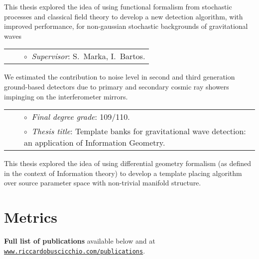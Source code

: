 This thesis explored the idea of using functional formalism from stochastic processes and classical field theory to develop a new detection algorithm, with improved performance, for non-gaussian stochastic backgrounds of gravitational waves

\vspace{0.2cm}
\vspace{-0.1cm}
\begin{tabular}{rcl}
&\hspace{0.4cm} &$\circ\;\;${\textit{Supervisor}}: S.~Marka, I.~Bartos.
\end{tabular}
\vspace{0.2cm}

We estimated the contribution to noise level in second and third generation ground-based detectors due to primary and secondary cosmic ray showers impinging on the interferometer mirrors.

\vspace{0.2cm}
\vspace{-0.1cm}
\begin{tabular}{rcl}
&\hspace{0.4cm} &$\circ\;\;${\textit{Final degree grade}}: 109/110.\\
&\hspace{0.4cm} &$\circ\;\;${\textit{Thesis title}}: Template banks for gravitational wave detection: an application of Information Geometry.
\end{tabular}
\vspace{0.2cm}


This thesis explored the idea of using differential geometry formalism (as defined in the context of Information theory) to develop a template placing algorithm over source parameter space with non-trivial manifold structure.

\section{Metrics}



\textbf{Full list of publications} available 
below and
at \href{http://www.riccardobuscicchio.com/publications}{\texttt{www.riccardobuscicchio.com/publications}}.

